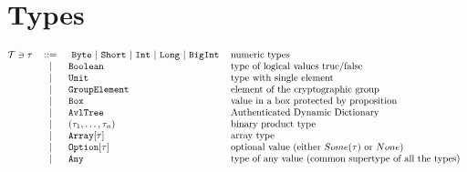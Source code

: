 \documentclass[11pt]{article}
\newcommand{\lst}[1]{\text{\lstinline[basicstyle={\ttfamily}]$#1$}}
\begin{document}
\section{Types}

\[\begin{tabular}{@{}l c l l}
      $\mathcal{T} \ni \tau$			& ::= 	    &\
         \lst{Byte} $\mid$ \lst{Short} $\mid$
         \lst{Int} $\mid$ \lst{Long} $\mid$ \lst{BigInt}  & numeric types     \\
      &	$\mid$	& \lst{Boolean} 			& type of logical values true/false   \\
      &	$\mid$	& \lst{Unit} 				& type with single element   \\
      &	$\mid$	& \lst{GroupElement} 		& element of the cryptographic group  \\
      &	$\mid$	& \lst{Box} 				& value in a box protected by proposition  \\
      &	$\mid$	& \lst{AvlTree} 			&  Authenticated Dynamic Dictionary \\
      &	$\mid$	& $(\tau_1, \dots, \tau_n) $	& binary product type  \\
      & $\mid$  & $\text{\lst{Array}}[\tau]$	& array type       \\
      & $\mid$  & $\text{\lst{Option}}[\tau]$	& optional value (either $Some(\tau)$ or $None$)      \\
      & $\mid$  & \lst{Any}                     & type of any value (common supertype of all the types) \\
\end{tabular}\]
\end{document}
